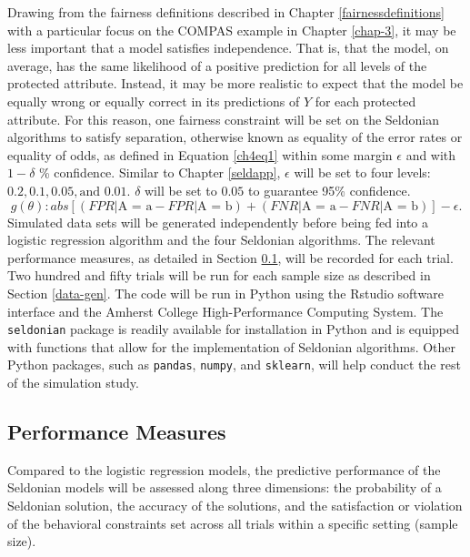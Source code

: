 \documentclass[12pt, twoside]{amherstthesis}
\begin{document}
Drawing from the fairness definitions described in Chapter \ref{fairnessdefinitions} with a particular focus on the COMPAS example in Chapter \ref{chap-3}, it may be less important that a model satisfies independence. That is, that the model, on average, has the same likelihood of a positive prediction for all levels of the protected attribute. Instead, it may be more realistic to expect that the model be equally wrong or equally correct in its predictions of \(Y\) for each protected attribute. For this reason, one fairness constraint will be set on the Seldonian algorithms to satisfy separation, otherwise known as equality of the error rates or equality of odds, as defined in Equation \ref{ch4eq1} within some margin \(\epsilon\) and with \(1 - \delta\) \% confidence. Similar to Chapter \ref{seldapp}, \(\epsilon\) will be set to four levels: \(0.2, 0.1, 0.05, \text{and } 0.01\). \(\delta\) will be set to \(0.05\) to guarantee 95\% confidence.
\begin{equation}
\label{ch4eq1}
g(\theta): abs[(FPR | \text{A = a} - FPR | \text{A = b}) + (FNR | \text{A = a} - FNR | \text{A = b})] - \epsilon.
\end{equation}
Simulated data sets will be generated independently before being fed into a logistic regression algorithm and the four Seldonian algorithms. The relevant performance measures, as detailed in Section \ref{performancemeasures}, will be recorded for each trial. Two hundred and fifty trials will be run for each sample size as described in Section \ref{data-gen}. The code will be run in Python using the Rstudio software interface and the Amherst College High-Performance Computing System. The \texttt{seldonian} package is readily available for installation in Python and is equipped with functions that allow for the implementation of Seldonian algorithms. Other Python packages, such as \texttt{pandas}, \texttt{numpy}, and \texttt{sklearn}, will help conduct the rest of the simulation study.

\hypertarget{performancemeasures}{%
\subsection{Performance Measures}\label{performancemeasures}}

Compared to the logistic regression models, the predictive performance of the Seldonian models will be assessed along three dimensions: the probability of a Seldonian solution, the accuracy of the solutions, and the satisfaction or violation of the behavioral constraints set across all trials within a specific setting (sample size).
\end{document}
